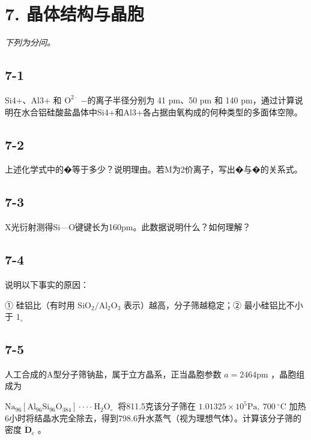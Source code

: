 \section*{7. 晶体结构与晶胞}
\textit{下列为分问。}

\subsection*{7-1}
Si4+、Al3+ 和 $\mathrm { O ^ { 2 \cdot } }$ −的离⼦半径分别为 41 pm、50 pm 和 140 pm，通过计算说明在⽔合铝硅酸盐晶体中Si4+和Al3+各占据由氧构成的何种类型的多⾯体空隙。

\subsection*{7-2}
上述化学式中的�等于多少？说明理由。若M为2价离⼦，写出�与�的关系式。

\subsection*{7-3}
X光衍射测得Si—O键键⻓为160pm。此数据说明什么？如何理解？

\subsection*{7-4}
说明以下事实的原因：

① 硅铝⽐（有时⽤ $\mathrm { S i O _ { 2 } / A l _ { 2 } O _ { 3 } }$ 表⽰）越⾼，分⼦筛越稳定；② 最⼩硅铝⽐不⼩于 $1 _ { \circ }$

\subsection*{7-5}
⼈⼯合成的A型分⼦筛钠盐，属于⽴⽅晶系，正当晶胞参数 $a = 2 4 6 4 \mathrm { p m }$ ，晶胞组成为

$\mathrm { N a _ { 9 6 } [ A l _ { 9 6 } S i _ { 9 6 } O _ { 3 8 4 } ] { \cdot } { \cdot } { \cdot } { \cdot } { \mathrm { ~ H _ { 2 } O _ { \circ } ~ } } }$ 将811.5克该分⼦筛在 $1 . 0 1 3 2 5 \times 1 0 ^ { 5 } \mathrm { P a } , ~ 7 0 0 ~ ^ { \circ } \mathrm { C }$ 加热6⼩时将结晶⽔完全除去，得到798.6升⽔蒸⽓（视为理想⽓体）。计算该分⼦筛的密度 $\dot { \boldsymbol { D } } _ { \mathrm { c } }$ 。
